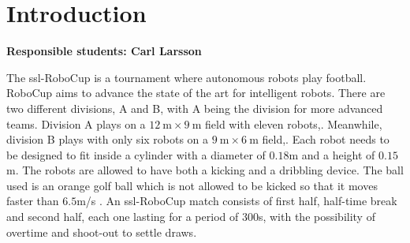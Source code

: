 \section{Introduction}
\label{section:introduction}


\textbf{Responsible students: Carl Larsson}


The \ac{ssl}-RoboCup is a tournament where autonomous robots play football\:\cite{da_silva_costa_multi-robot_2024}. RoboCup aims to advance the state of the art for intelligent robots\:\cite{robocup_small_size_league_small_2024}. 
There are two different divisions, A and B, with A being the division for more advanced teams\:\cite{robocup_small_size_league_rules_2024}. Division A plays on a $12\:\text{m} \times 9\:\text{m}$ field with eleven robots\:\cite{da_silva_costa_multi-robot_2024},\cite{robocup_small_size_league_rules_2024}. Meanwhile, division B plays with only six robots on a $9\:\text{m} \times 6\:\text{m}$ field\:\cite{da_silva_costa_multi-robot_2024},\cite{robocup_small_size_league_rules_2024}. 
Each robot needs to be designed to fit inside a cylinder with a diameter of $0.18$\:\ac{m} and a height of $0.15$\:\ac{m}\:\cite{robocup_small_size_league_rules_2024}. The robots are allowed to have both a kicking and a dribbling device\:\cite{robocup_small_size_league_rules_2024}. The ball used is an orange golf ball which is not allowed to be kicked so that it moves faster than $6.5$\:\ac{m/s} \cite{robocup_small_size_league_rules_2024}. 
An \ac{ssl}-RoboCup match consists of first half, half-time break and second half, each one lasting for a period of $300$\:\ac{s}, with the possibility of overtime and shoot-out to settle draws\:\cite{robocup_small_size_league_rules_2024}.


